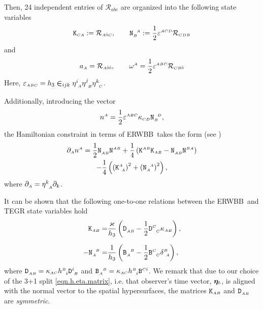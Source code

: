 \documentclass[
10pt, %
a4paper, %
oneside, %
twocolumn,
headinclude,footinclude, %
BCOR5mm, %
]{scrartcl}
\newcommand{\ERWBB}{{ERWBB}}
\newcommand{\sA}{\mathsmaller A}
\newcommand{\sB}{\mathsmaller B}
\newcommand{\sC}{\mathsmaller C}
\newcommand{\sD}{\mathsmaller D}
\newcommand{\pd}[1]{\partial_{#1}}
\newcommand{\mg}[1]{\kappa_{#1}}			%
\newcommand{\MG}[1]{\kappa^{#1}}			%
\newcommand{\tetrsymbol}{h}
\newcommand{\itetrsymbol}{\eta}
\newcommand{\itetr}[2]{\itetrsymbol^{#1}_{\phantom{#1}#2}}
\newcommand{\tetr}[2]{\tetrsymbol^{#1}_{\phantom{#1}#2}}
\newcommand{\detTetr}{\tetrsymbol}
\newcommand{\bas}[1]{\bm{\itetrsymbol}_{#1}}
\newcommand{\Dfin}[2]{\mathtt{D}_{\phantom{#2}#1}^{#2}}	%
\newcommand{\Kbuch}[2]{\mathtt{K}_{{#1}{#2}}}	%
\newcommand{\Nbuch}[2]{\mathtt{N}_{#1}^{\ \,#2}}	%
\newcommand{\Kbuchmix}[2]{\mathtt{K}^{#1}_{\ #2}}	%
\newcommand{\Nbuchmix}[2]{\mathtt{N}^{#1}_{\ #2}}	%
\newcommand{\Bfin}[2]{\mathtt{B}^{#1#2}}	%
\newcommand{\Bfinmix}[2]{\mathtt{B}^{#1}_{\phantom{#1}#2}}	%
\newcommand{\Bfinmixx}[2]{\mathtt{B}_{#1}^{\phantom{#1}#2}}	%
\newcommand{\LCsymb}{\bm{\in}}    %
\newcommand{\LCtens}{\varepsilon} %
\newcommand{\KD}[2]{\delta^{#1}_{\ #2}}
\newcommand{\indalg}[1]{\hat{\mathsmaller{#1}}}
\newcommand{\lapse}{\alpha}
\begin{document}
	Then, 24 independent entries of $ \mathcal{R}_{abc} $ are organized into the following state 
	variables
	\begin{equation}\label{eqn.KN}
		\Kbuch{\sC}{\sA} := \mathcal{R}_{\sA\indalg{0}\sC},
		\qquad
		\Nbuch{\sB}{\sA} := \frac{1}{2} \LCtens^{\sA\sC\sD}\mathcal{R}_{\sC\sD\sB}
	\end{equation}
	and 
	\begin{equation}\label{eqn.aw}
		a_{\sA} = \mathcal{R}_{\sA\indalg{0}\indalg{0}},
		\qquad
		\omega^{\sA} = \frac{1}{2} \LCtens^{\sA\sB\sC} \mathcal{R}_{\sC\sB\indalg{0}}
	\end{equation}
	Here, $ \LCtens_{\sA\sB\sC} = 
	\detTetr_3 \LCsymb_{ijk}\itetr{i}{\sA}\itetr{j}{\sB}\itetr{k}{\sC} $.

	Additionally, introducing the vector
	\begin{equation}
		n^\sA = \frac{1}{2} \LCtens^{\sA\sB\sC} \mg{\sC\sD} \Nbuch{\sB}{\sD},
	\end{equation}
	the Hamiltonian constraint in terms of \ERWBB\ takes the form (see \cite[eq.(A1)]{Buchman2003})
	\begin{multline}\label{eqn.Hamiltonian.ERWBB}
		\pd{\sA} n^\sA = \frac12 \Nbuch{\sA\sB}{}\Nbuchmix{\sA\sB}{} + \frac14\left( \Kbuchmix{\sA\sB}{}\Kbuch{\sA}{\sB} - \Nbuch{\sA\sB}{}\Nbuchmix{\sB\sA}{} \right) 
		\\
		- \frac14\left( \left( \Kbuchmix{\sA}{\sA} \right)^2 + \left( \Nbuch{\sA}{\sA} \right)^2\right),
	\end{multline}
	where $\pd{\sA} = \itetr{k}{\sA}\pd{k}$.

	It can be shown that the following one-to-one relations between the \ERWBB\ and TEGR state variables hold
	\begin{subequations}\label{eqn.Buchman.TEGR.KN}
		\begin{align}
			\Kbuch{\sA}{\sB} = & \frac{\varkappa}{\detTetr_3} 
			\left(
			\Dfin{\sA\sB}{}-\frac{1}{2} \Dfin{\sC}{\sC} \mg{\sA\sB}
			\right),\\[2mm]
			-\Nbuch{\sA}{\sB} =&\frac{1}{\detTetr_3}
			\left(
			\Bfinmixx{\sA}{\sB} - \frac{1}{2}\Bfinmix{\sC}{\sC}\KD{\sB}{\sA}
			\right),
		\end{align}
	\end{subequations}
	where $\Dfin{\sA\sB}{} = \mg{\sA\sC}\tetr{\sB}{i}\Dfin{\sB}{i}$ and $\Bfinmixx{\sA}{\sB} = \mg{\sA\sC}\tetr{\sB}{i}\Bfin{\sC}{i}$. We remark that due to our choice of the 3+1 split \eqref{eqn.h.eta.matrix},
	i.e. that observer's time vector, $ \bas{\indalg{0}} $, is aligned with the
	normal vector to the spatial hypersurfaces, the matrices $ \Kbuch{\sA}{\sB}
	$ and $ \Dfin{\sA\sB}{} $ are \textit{symmetric}.
	
\end{document}
